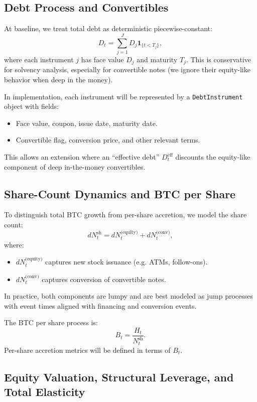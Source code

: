 \documentclass[11pt]{article}
\begin{document}
\subsection{Debt Process and Convertibles}

At baseline, we treat total debt as deterministic piecewise-constant:
$$
  D_t = \sum_{j=1}^J D_j \mathbf 1_{\{t < T_j\}},
$$
where each instrument $j$ has face value $D_j$ and maturity $T_j$.
This is conservative for solvency analysis, especially for convertible notes (we ignore their equity-like behavior when deep in the money).

In implementation, each instrument will be represented by a \texttt{DebtInstrument} object with fields:
\begin{itemize}
  \item Face value, coupon, issue date, maturity date.
  \item Convertible flag, conversion price, and other relevant terms.
\end{itemize}

This allows an extension where an ``effective debt'' $D_t^{\text{eff}}$ discounts the equity-like component of deep in-the-money convertibles.

\subsection{Share-Count Dynamics and BTC per Share}

To distinguish total BTC growth from per-share accretion, we model the share count:
$$
  dN_t^{\text{sh}} = dN_t^{\text{(equity)}} + dN_t^{\text{(conv)}},
$$
where:
\begin{itemize}
  \item $dN_t^{\text{(equity)}}$ captures new stock issuance (e.g. ATMs, follow-ons).
  \item $dN_t^{\text{(conv)}}$ captures conversion of convertible notes.
\end{itemize}

In practice, both components are lumpy and are best modeled as jump processes with event times aligned with financing and conversion events.

The BTC per share process is:
$$
  B_t = \frac{H_t}{N_t^{\text{sh}}}.
$$
Per-share accretion metrics will be defined in terms of $B_t$.

\subsection{Equity Valuation, Structural Leverage, and Total Elasticity}
\end{document}
